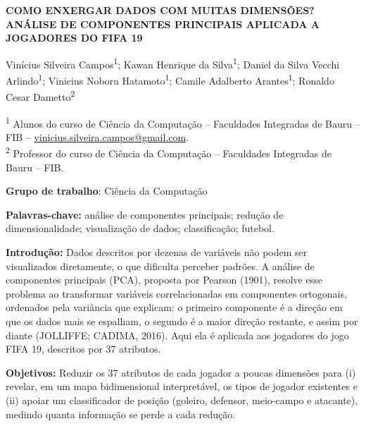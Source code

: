 \documentclass[10pt,oneside,a4paper,brazil]{abntex2}
\newcommand{\linhabranca}{\par\vspace{\baselineskip}}
\begin{document}
\frenchspacing
\pagestyle{jornada}
\thispagestyle{jornada}

\begin{center}
\textbf{COMO ENXERGAR DADOS COM MUITAS DIMENSÕES? ANÁLISE DE COMPONENTES
PRINCIPAIS APLICADA A JOGADORES DO FIFA 19}

\vspace{\baselineskip}

Vinícius Silveira Campos\textsuperscript{1}; Kawan Henrique da Silva\textsuperscript{1};
Daniel da Silva Vecchi Arlindo\textsuperscript{1}; Vinicius Noboru Hatamoto\textsuperscript{1};
Camile Adalberto Arantes\textsuperscript{1}; Ronaldo Cesar Dametto\textsuperscript{2}

\textsuperscript{1} Alunos do curso de Ciência da Computação -- Faculdades
Integradas de Bauru -- FIB -- \url{vinicius.silveira.campos@gmail.com}.\\
\textsuperscript{2} Professor do curso de Ciência da Computação -- Faculdades
Integradas de Bauru -- FIB.
\end{center}

\linhabranca

\textbf{Grupo de trabalho}: Ciência da Computação

\linhabranca

\textbf{Palavras-chave:} análise de componentes principais; redução de
dimensionalidade; visualização de dados; classificação; futebol.

\linhabranca

\textbf{Introdução:} Dados descritos por dezenas de variáveis não podem ser
visualizados diretamente, o que dificulta perceber padrões. A análise de componentes principais (PCA),
proposta por Pearson (1901), resolve esse problema ao transformar variáveis
correlacionadas em componentes ortogonais, ordenados pela variância que
explicam: o primeiro componente é a direção em que os dados mais se
espalham, o segundo é a maior direção restante, e assim por diante
(JOLLIFFE; CADIMA, 2016). Aqui ela é aplicada aos jogadores do jogo
FIFA 19, descritos por 37 atributos.

\linhabranca

\textbf{Objetivos:} Reduzir os 37 atributos de cada jogador a poucas
dimensões para (i) revelar, em um mapa bidimensional interpretável, os tipos
de jogador existentes e (ii) apoiar um classificador de posição (goleiro,
defensor, meio-campo e atacante), medindo quanta informação se perde a cada
redução.
\end{document}
